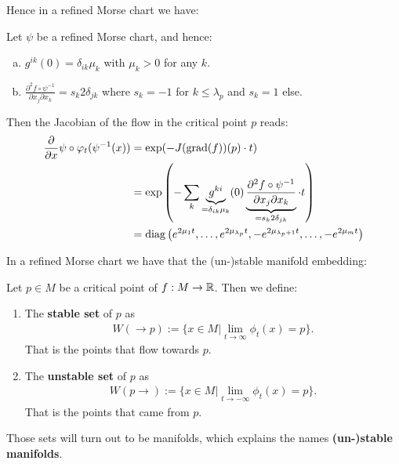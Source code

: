 Hence in a refined Morse chart we have:
\begin{remark}\label{rem:morse-jacobianOfTheFlowInRefinedMorsechart}
	Let $\psi$ be a refined Morse chart, and hence:
	\begin{enumerate}[(a)]
		\item $g^{ik}(0)=\delta_{ik}\mu_k$ with $\mu_k>0$ for any $k$.
		\item $\frac{\partial ^2 f\circ \psi^{-1}}{\partial x_j\partial x_k}=s_k2\delta_{jk}$ where $s_k=-1$ for $k\leq \lambda_p$ and $s_k=1$ else.
	\end{enumerate}  Then the Jacobian of the flow in the critical point $p$ reads:
	\begin{align*}
	\frac{\partial}{\partial x} \psi \circ \varphi_t(\psi^{-1}(x))
	&=\exp(-J(\mathrm{grad}(f))(p)\cdot t)\\
	&=\exp \left(-\sum_k \underbrace{g^{ki}}_{=\delta_{ik}\mu_k}(0) \underbrace{\frac{\partial ^2 f\circ \psi^{-1}}{\partial x_j\partial x_k}}_{=s_k2\delta_{jk}}\cdot t\right) \\
	&=\mathrm{diag}\left(e^{2\mu_1 t},\dots,e^{2\mu_{\lambda_p} t},-e^{2\mu_{\lambda_p+1} t},\dots ,-e^{2\mu_m t} \right)
	\end{align*}
\end{remark}


In a refined Morse chart we have that the (un-)stable manifold embedding:
\begin{definition} 
	Let $p\in M$ be a critical point of $f:M\to \mathbb{R}$. Then we define:
	\begin{enumerate}
		\item The \textbf{stable set} of $p$ as 
		\begin{align*}
			W(\to p):=\{x\in M| \lim_{t\to \infty} \phi_t(x)=p\}.
		\end{align*} That is the points that flow towards $p$.
		\item The \textbf{unstable set} of $p$ as 
		\begin{align*}
			W(p\to):=\{x\in M| \lim_{t\to -\infty} \phi_t(x)=p\}.  
		\end{align*} That is the points that came from $p$. 
	\end{enumerate}
	Those sets will turn out to be manifolds, which explains the names \textbf{(un-)stable manifolds}.
\end{definition} 

